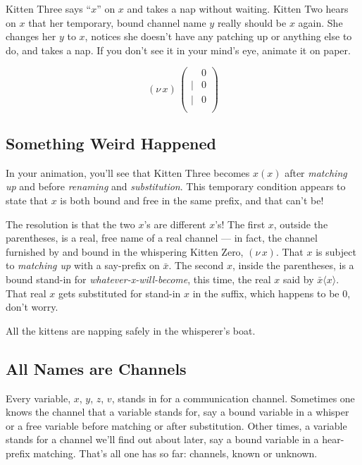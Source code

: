 \documentclass[10pt,oneside,x11names]{article}
\newcommand\napping    [0]{0}
\newcommand\whispering [2]{(\nu\,#1)\,{#2}}
\theoremstyle{definition}
\theoremstyle{warning}
\begin{document}
Kitten Three says ``\(x\)'' on \(x\) and takes a nap without
waiting. Kitten Two hears on \(x\) that her temporary, bound
channel name \(y\) really should be \(x\) again. She changes her
\(y\) to \(x\), notices she doesn't have any patching up or
anything else to do, and takes a nap. If you don't see it in
your mind's eye, animate it on paper.

\begin{equation}
\whispering{x}{\left(
\begin{array}{clll}
 {}     & \napping   \\
 \vert  & {\napping} \\
 \vert  & {\napping} \\
\end{array}\right)}
\end{equation}

\subsection{Something Weird Happened}
\label{sec:org4737ff6}
\label{weird}
In your animation, you'll see that Kitten Three becomes \(x(x)\)
after \emph{matching up} and before \emph{renaming} and \emph{substitution}. This
temporary condition appears to state that \(x\) is both bound and
free in the same prefix, and that can't be!

The resolution is that the two \(x\)'s are different \(x\)'s! The
first \(x\), outside the parentheses, is a real, free name of a
real channel --- in fact, the channel furnished by and bound
in the whispering Kitten Zero, \((\nu\,x)\). That \(x\) is subject
to \emph{matching up} with a say-prefix on \(\bar{x}\). The second
\(x\), inside the parentheses, is a bound stand-in for
\emph{whatever-x-will-become}, this time, the real
\(x\) said by  \(\bar{x}\langle{x}\rangle\). That real \(x\) gets
substituted for stand-in \(x\) in the suffix, which happens to
be \(0\), don't worry.

All the kittens are napping safely in the whisperer's boat.

\subsection{All Names are Channels}
\label{sec:orge2435db}

Every variable, \(x\), \(y\), \(z\), \(v\), stands in for a
communication channel. Sometimes one knows the channel that a
variable stands for, say a bound variable in a whisper or a
free variable before matching or after substitution. Other
times, a variable stands for a channel we'll find out about
later, say a bound variable in a hear-prefix matching. That's
all one has so far: channels, known or unknown.
\end{document}
